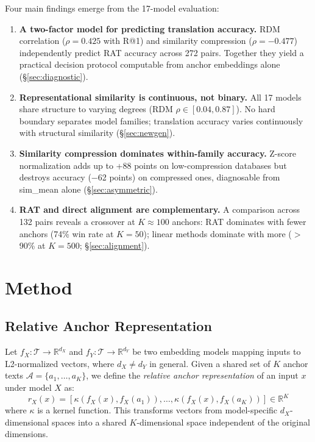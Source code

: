 \documentclass{article}
\begin{document}
Four main findings emerge from the 17-model evaluation:
\begin{enumerate}
  \item \textbf{A two-factor model for predicting translation accuracy.} RDM correlation ($\rho = 0.425$ with R@1) and similarity compression ($\rho = -0.477$) independently predict RAT accuracy across 272 pairs. Together they yield a practical decision protocol computable from anchor embeddings alone (\S\ref{sec:diagnostic}).
  \item \textbf{Representational similarity is continuous, not binary.} All 17 models share structure to varying degrees (RDM $\rho \in [0.04, 0.87]$). No hard boundary separates model families; translation accuracy varies continuously with structural similarity (\S\ref{sec:newgen}).
  \item \textbf{Similarity compression dominates within-family accuracy.} Z-score normalization adds up to +88 points on low-compression databases but destroys accuracy ($-$62 points) on compressed ones, diagnosable from sim\_mean alone (\S\ref{sec:asymmetric}).
  \item \textbf{RAT and direct alignment are complementary.} A comparison across 132 pairs reveals a crossover at $K \approx 100$ anchors: RAT dominates with fewer anchors (74\% win rate at $K{=}50$); linear methods dominate with more ($>$90\% at $K{=}500$; \S\ref{sec:alignment}).
\end{enumerate}

\section{Method}
\label{sec:method}

\subsection{Relative Anchor Representation}

Let $f_X: \mathcal{T} \to \mathbb{R}^{d_X}$ and $f_Y: \mathcal{T} \to \mathbb{R}^{d_Y}$ be two embedding models mapping inputs to L2-normalized vectors, where $d_X \neq d_Y$ in general. Given a shared set of $K$ anchor texts $\mathcal{A} = \{a_1, \dots, a_K\}$, we define the \emph{relative anchor representation} of an input $x$ under model $X$ as:
\begin{equation}
  r_X(x) = \left[ \kappa(f_X(x), f_X(a_1)), \dots, \kappa(f_X(x), f_X(a_K)) \right] \in \mathbb{R}^K
  \label{eq:relative}
\end{equation}
where $\kappa$ is a kernel function. This transforms vectors from model-specific $d_X$-dimensional spaces into a shared $K$-dimensional space independent of the original dimensions.
\end{document}

